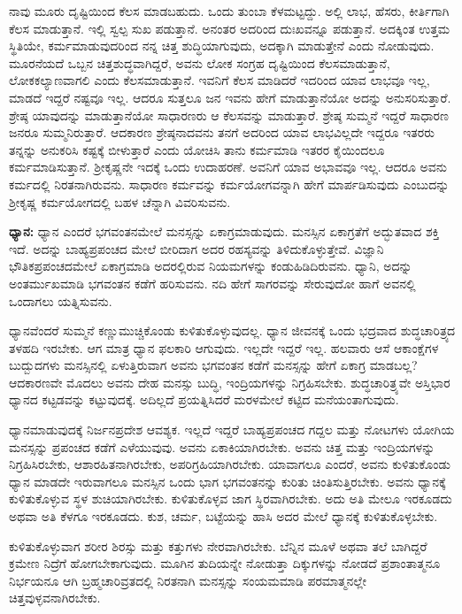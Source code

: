 ನಾವು ಮೂರು ದೃಷ್ಟಿಯಿಂದ ಕೆಲಸ ಮಾಡಬಹುದು. ಒಂದು ತುಂಬಾ ಕೆಳಮಟ್ಟದ್ದು. ಅಲ್ಲಿ ಲಾಭ, ಹೆಸರು, ಕೀರ್ತಿಗಾಗಿ ಕೆಲಸ ಮಾಡುತ್ತಾನೆ. ಇಲ್ಲಿ ಸ್ವಲ್ಪ ಸುಖ ಪಡುತ್ತಾನೆ. ಅನಂತರ ಅದರಿಂದ ದುಃಖವನ್ನೂ ಪಡುತ್ತಾನೆ. ಅದಕ್ಕಿಂತ ಉತ್ತಮ ಸ್ಥಿತಿಯೇ, ಕರ್ಮಮಾಡುವುದರಿಂದ ನನ್ನ ಚಿತ್ತ ಶುದ್ಧಿಯಾಗುವುದು, ಅದಕ್ಕಾಗಿ ಮಾಡುತ್ತೇನೆ ಎಂದು ನೋಡುವುದು. ಮೂರನೆಯದೆ ಒಬ್ಬನ ಚಿತ್ತಶುದ್ಧವಾಗಿದ್ದರೆ, ಅವನು ಲೋಕ ಸಂಗ್ರಹ ದೃಷ್ಟಿಯಿಂದ ಕೆಲಸಮಾಡುತ್ತಾನೆ, ಲೋಕಕಲ್ಯಾಣ\-ವಾಗಲಿ ಎಂದು ಕೆಲಸಮಾಡುತ್ತಾನೆ. ಇವನಿಗೆ ಕೆಲಸ ಮಾಡಿದರೆ ಇದರಿಂದ ಯಾವ ಲಾಭವೂ ಇಲ್ಲ, ಮಾಡದೆ ಇದ್ದರೆ ನಷ್ಟವೂ ಇಲ್ಲ. ಆದರೂ ಸುತ್ತಲೂ ಜನ ಇವನು ಹೇಗೆ ಮಾಡುತ್ತಾನೆಯೋ ಅದನ್ನು ಅನುಸರಿಸುತ್ತಾರೆ. ಶ್ರೇಷ್ಠ ಯಾವುದನ್ನು ಮಾಡುತ್ತಾನೆಯೋ ಸಾಧಾರಣರು ಆ ಕೆಲಸವನ್ನು ಮಾಡುತ್ತಾರೆ. ಶ್ರೇಷ್ಠ ಸುಮ್ಮನೆ ಇದ್ದರೆ ಸಾಧಾರಣ ಜನರೂ ಸುಮ್ಮನಿರುತ್ತಾರೆ. ಆದಕಾರಣ ಶ್ರೇಷ್ಠನಾದವನು ತನಗೆ ಅದರಿಂದ ಯಾವ ಲಾಭವಿಲ್ಲದೇ ಇದ್ದರೂ ಇತರರು ತನ್ನನ್ನು ಅನುಕರಿಸಿ ಕಷ್ಟಕ್ಕೆ ಬೀಳುತ್ತಾರೆ ಎಂದು ಯೋಚಿಸಿ ತಾನು ಕರ್ಮಮಾಡಿ ಇತರರ ಕೈಯಿಂದಲೂ ಕರ್ಮಮಾಡಿಸುತ್ತಾನೆ. ಶ‍್ರೀಕೃಷ್ಣನೇ ಇದಕ್ಕೆ ಒಂದು ಉದಾಹರಣೆ. ಅವನಿಗೆ ಯಾವ ಅಭಾವವೂ ಇಲ್ಲ. ಆದರೂ ಅವನು ಕರ್ಮದಲ್ಲಿ ನಿರತನಾಗಿರುವನು. ಸಾಧಾರಣ ಕರ್ಮವನ್ನು ಕರ್ಮಯೋಗವನ್ನಾಗಿ ಹೇಗೆ ಮಾರ್ಪಡಿಸುವುದು ಎಂಬುದನ್ನು ಶ‍್ರೀಕೃಷ್ಣ ಕರ್ಮಯೋಗದಲ್ಲಿ ಬಹಳ ಚೆನ್ನಾಗಿ ವಿವರಿಸುವನು.

\textbf{ಧ್ಯಾನ:} ಧ್ಯಾನ ಎಂದರೆ ಭಗವಂತನಮೇಲೆ ಮನಸ್ಸನ್ನು ಏಕಾಗ್ರಮಾಡುವುದು. ಮನಸ್ಸಿನ ಏಕಾಗ್ರತೆಗೆ ಅದ್ಭುತವಾದ ಶಕ್ತಿ ಇದೆ. ಅದನ್ನು ಬಾಹ್ಯಪ್ರಪಂಚದ ಮೇಲೆ ಬೀರಿದಾಗ ಅದರ ರಹಸ್ಯವನ್ನು ತಿಳಿದುಕೊಳ್ಳುತ್ತೇವೆ. ವಿಜ್ಞಾನಿ ಭೌತಿಕಪ್ರಪಂಚದಮೇಲೆ ಏಕಾಗ್ರಮಾಡಿ ಅದರಲ್ಲಿರುವ ನಿಯಮಗಳನ್ನು ಕಂಡುಹಿಡಿದಿರುವನು. ಧ್ಯಾನಿ, ಅದನ್ನು ಅಂತರ್ಮುಖಮಾಡಿ ಭಗವಂತನ ಕಡೆಗೆ ಹರಿಸುವನು. ನದಿ ಹೇಗೆ ಸಾಗರವನ್ನು ಸೇರುವುದೋ ಹಾಗೆ ಅವನಲ್ಲಿ ಒಂದಾಗಲು ಯತ್ನಿಸುವನು.

ಧ್ಯಾನವೆಂದರೆ ಸುಮ್ಮನೆ ಕಣ್ಣುಮುಚ್ಚಿಕೊಂಡು ಕುಳಿತುಕೊಳ್ಳುವುದಲ್ಲ. ಧ್ಯಾನ ಜೀವನಕ್ಕೆ ಒಂದು ಭದ್ರವಾದ ಶುದ್ಧಚಾರಿತ್ರ್ಯದ ತಳಹದಿ ಇರಬೇಕು. ಆಗ ಮಾತ್ರ ಧ್ಯಾನ ಫಲಕಾರಿ ಆಗುವುದು. ಇಲ್ಲದೇ ಇದ್ದರೆ ಇಲ್ಲ. ಹಲವಾರು ಆಸೆ ಆಕಾಂಕ್ಷೆಗಳ ಬುದ್ಬುದಗಳು ಮನಸ್ಸಿನಲ್ಲಿ ಏಳುತ್ತಿರುವಾಗ ಅವನು ಭಗವಂತನ ಕಡೆಗೆ ಮನಸ್ಸನ್ನು ಹೇಗೆ ಏಕಾಗ್ರ ಮಾಡಬಲ್ಲ? ಆದಕಾರಣವೇ ಮೊದಲು ಅವನು ದೇಹ ಮನಸ್ಸು ಬುದ್ಧಿ, ಇಂದ್ರಿಯಗಳನ್ನು ನಿಗ್ರಹಿಸಬೇಕು. ಶುದ್ಧಚಾರಿತ್ರ್ಯವೇ ಅಸ್ತಿಭಾರ ಧ್ಯಾನದ ಕಟ್ಟಡವನ್ನು ಕಟ್ಟುವುದಕ್ಕೆ. ಅದಿಲ್ಲದೆ ಪ್ರಯತ್ನಿಸಿದರೆ ಮರಳಮೇಲೆ ಕಟ್ಟಿದ ಮನೆಯಂತಾಗುವುದು.

ಧ್ಯಾನಮಾಡುವುದಕ್ಕೆ ನಿರ್ಜನಪ್ರದೇಶ ಆವಶ್ಯಕ. ಇಲ್ಲದೆ ಇದ್ದರೆ ಬಾಹ್ಯಪ್ರಪಂಚದ ಗದ್ದಲ ಮತ್ತು ನೋಟಗಳು ಯೋಗಿಯ ಮನಸ್ಸನ್ನು ಪ್ರಪಂಚದ ಕಡೆಗೆ ಎಳೆಯುವುವು. ಅವನು ಏಕಾಕಿಯಾಗಿರಬೇಕು. ಅವನು ಚಿತ್ತ ಮತ್ತು ಇಂದ್ರಿಯಗಳನ್ನು ನಿಗ್ರಹಿಸಿರಬೇಕು, ಆಶಾರಹಿತ\-ನಾಗಿರಬೇಕು, ಅಪರಿಗ್ರಹಿಯಾಗಿರಬೇಕು. ಯಾವಾಗಲೂ ಎಂದರೆ, ಅವನು ಕುಳಿತುಕೊಂಡು ಧ್ಯಾನ ಮಾಡದೇ ಇರುವಾಗಲೂ ಮನಸ್ಸಿನ ಒಂದು ಭಾಗ ಭಗವಂತನನ್ನು ಕುರಿತು ಚಿಂತಿಸುತ್ತಿರಬೇಕು. ಅವನು ಧ್ಯಾನಕ್ಕೆ ಕುಳಿತುಕೊಳ್ಳುವ ಸ್ಥಳ ಶುಚಿಯಾಗಿರಬೇಕು. ಕುಳಿತುಕೊಳ್ಳವ ಜಾಗ ಸ್ಥಿರವಾಗಿರಬೇಕು. ಅದು ಅತಿ ಮೇಲೂ ಇರಕೂಡದು ಅಥವಾ ಅತಿ ಕೆಳಗೂ ಇರಕೂಡದು. ಕುಶ, ಚರ್ಮ, ಬಟ್ಟೆಯನ್ನು ಹಾಸಿ ಅದರ ಮೇಲೆ ಧ್ಯಾನಕ್ಕೆ ಕುಳಿತುಕೊಳ್ಳಬೇಕು.

ಕುಳಿತುಕೊಳ್ಳುವಾಗ ಶರೀರ ಶಿರಸ್ಸು ಮತ್ತು ಕತ್ತುಗಳು ನೇರವಾಗಿರಬೇಕು. ಬೆನ್ನಿನ ಮೂಳೆ ಅಥವಾ ತಲೆ ಬಾಗಿದ್ದರೆ ಕ್ರಮೇಣ ನಿದ್ರೆಗೆ ಹೋಗಬೇಕಾಗುವುದು. ಮೂಗಿನ ತುದಿಯನ್ನೇ ನೋಡುತ್ತಾ ದಿಕ್ಕುಗಳನ್ನು ನೋಡದೆ ಪ್ರಶಾಂತಾತ್ಮನೂ ನಿರ್ಭಯನೂ ಆಗಿ ಬ್ರಹ್ಮಚಾರಿವ್ರತದಲ್ಲಿ ನಿರತನಾಗಿ ಮನಸ್ಸನ್ನು ಸಂಯಮಮಾಡಿ ಪರಮಾತ್ಮನಲ್ಲೇ ಚಿತ್ತವುಳ್ಳವನಾಗಿರಬೇಕು.

